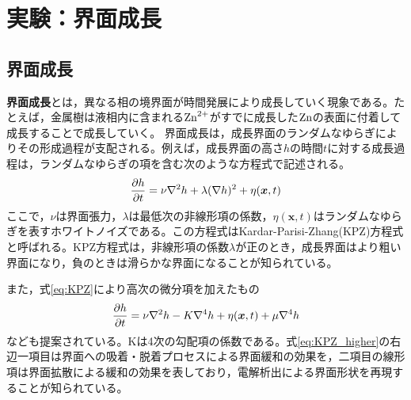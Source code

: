 \documentclass[autodetect-engine,dvi=dvipdfmx,a4paper,ja=standard,oneside,openany,11pt,draft]{bxjsbook}
\begin{document}
\section{実験：界面成長}
\subsection{界面成長}
\textbf{界面成長}とは，異なる相の境界面が時間発展により成長していく現象である。たとえば，金属樹は液相内に含まれる$\ce{Zn^{2+}}$がすでに成長した$\ce{Zn}$の表面に付着して成長することで成長していく。
界面成長は，成長界面のランダムなゆらぎによりその形成過程が支配される。例えば，成長界面の高さ$h$の時間$t$に対する成長過程は，ランダムなゆらぎの項を含む次のような方程式で記述される\cite{kardar1987scaling}。
\begin{equation}
  \pdv{h}{t}=\nu\nabla^2h+\lambda(\nabla h)^2+\eta(\bm{x},t)
  \label{eq:KPZ}
\end{equation}
ここで，$\nu$は界面張力，$\lambda$は最低次の非線形項の係数，$\eta(\bm{x},t)$はランダムなゆらぎを表すホワイトノイズである。この方程式はKardar-Parisi-Zhang(KPZ)方程式と呼ばれる。KPZ方程式は，非線形項の係数$\lambda$が正のとき，成長界面はより粗い界面になり，負のときは滑らかな界面になることが知られている。

また，式\ref{eq:KPZ}により高次の微分項を加えたもの\cite{wolf1990growth}
\begin{equation}
  \pdv{h}{t}=\nu\nabla^2h-K\nabla^4h+\eta(\bm{x},t)+\mu\nabla^4h
  \label{eq:KPZ_higher}
\end{equation}
なども提案されている。Kは4次の勾配項の係数である。式\eqref{eq:KPZ_higher}の右辺一項目は界面への吸着・脱着プロセスによる界面緩和の効果を，二項目の線形項は界面拡散による緩和の効果を表しており，電解析出による界面形状を再現することが知られている。
\end{document}

